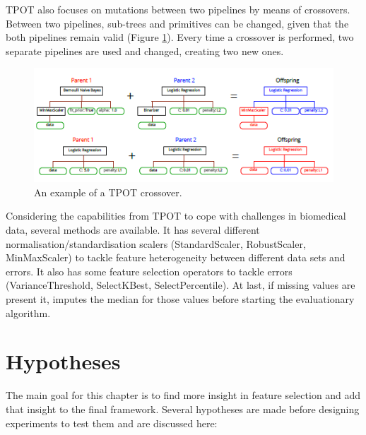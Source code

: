 \documentclass[10pt,a4paper]{report}
\begin{document}
	TPOT also focuses on mutations between two pipelines by means of crossovers. Between two pipelines, sub-trees and primitives can be changed, given that the both pipelines remain valid (Figure \ref{fig:TPOTCrossover}). Every time a crossover is performed, two separate pipelines are used and changed, creating two new ones.
	
	\begin{figure}[h!]
		\includegraphics[scale=1]{TPOTCrossover.png}
		\caption{An example of a TPOT crossover\cite{Gijsbers2017Thesis}.}
		\label{fig:TPOTCrossover}
	\end{figure}
	
	Considering the capabilities from TPOT to cope with challenges in biomedical data, several methods are available. It has several different normalisation/standardisation scalers (StandardScaler, RobustScaler, MinMaxScaler) to tackle feature heterogeneity between different data sets and errors. It also has some feature selection operators to tackle errors (VarianceThreshold, SelectKBest, SelectPercentile). At last, if missing values are present it, imputes the median for those values before starting the evaluationary algorithm.
	
	\newpage
	\section{Hypotheses}
	\label{FSsec:hypotheses}
	
	The main goal for this chapter is to find more insight in feature selection and add that insight to the final framework. Several hypotheses are made before designing experiments to test them and are discussed here:
	
\end{document}
